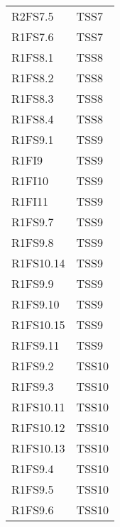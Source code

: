 {\begin{longtable}{C{4cm} C{4cm}}
R2FS7.5 & TSS7 \\
R1FS7.6 & TSS7 \\
R1FS8.1 & TSS8 \\
R1FS8.2 & TSS8 \\
R1FS8.3 & TSS8 \\
R1FS8.4 & TSS8 \\
R1FS9.1 & TSS9 \\
R1FI9 & TSS9 \\
R1FI10 & TSS9 \\
R1FI11 & TSS9 \\
R1FS9.7 & TSS9 \\
R1FS9.8 & TSS9 \\
R1FS10.14 & TSS9 \\
R1FS9.9 & TSS9 \\
R1FS9.10 & TSS9 \\
R1FS10.15 & TSS9 \\
R1FS9.11 & TSS9 \\
R1FS9.2 & TSS10 \\
R1FS9.3 & TSS10 \\
R1FS10.11 & TSS10 \\
R1FS10.12 & TSS10 \\
R1FS10.13 & TSS10 \\
R1FS9.4 & TSS10 \\
R1FS9.5 & TSS10 \\
R1FS9.6 & TSS10 \\

\end{longtable}
}






















